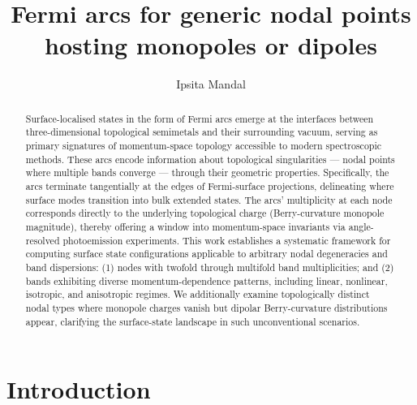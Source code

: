 \documentclass[aps,prb,onecolumn, footinbib, 10pt]{revtex4-2}
\begin{document}
\title{Fermi arcs for generic nodal points hosting monopoles or dipoles}


\author{Ipsita Mandal}



\begin{abstract}
Surface-localised states in the form of Fermi arcs emerge at the interfaces between three-dimensional topological semimetals and their surrounding vacuum, serving as primary signatures of momentum-space topology accessible to modern spectroscopic methods. These arcs encode information about topological singularities --- nodal points where multiple bands converge --- through their geometric properties. Specifically, the arcs terminate tangentially at the edges of Fermi-surface projections, delineating where surface modes transition into bulk extended states. The arcs' multiplicity at each node corresponds directly to the underlying topological charge (Berry-curvature monopole magnitude), thereby offering a window into momentum-space invariants via angle-resolved photoemission experiments. This work establishes a systematic framework for computing surface state configurations applicable to arbitrary nodal degeneracies and band dispersions: (1) nodes with twofold through multifold band multiplicities; and (2) bands exhibiting diverse momentum-dependence patterns, including linear, nonlinear, isotropic, and anisotropic regimes. We additionally examine topologically distinct nodal types where monopole charges vanish but dipolar Berry-curvature distributions appear, clarifying the surface-state landscape in such unconventional scenarios.
\end{abstract}

\maketitle

\tableofcontents


\section{Introduction}
\end{document}
